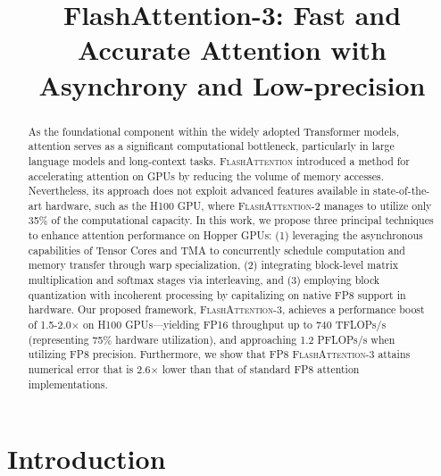 \title{FlashAttention-3: Fast and Accurate Attention with Asynchrony and Low-precision}

\begin{abstract}
As the foundational component within the widely adopted Transformer models, attention serves as a significant computational bottleneck, particularly in large language models and long-context tasks. \textsc{FlashAttention} introduced a method for accelerating attention on GPUs by reducing the volume of memory accesses. Nevertheless, its approach does not exploit advanced features available in state-of-the-art hardware, such as the H100 GPU, where \textsc{FlashAttention-2} manages to utilize only 35\% of the computational capacity. In this work, we propose three principal techniques to enhance attention performance on Hopper GPUs: (1) leveraging the asynchronous capabilities of Tensor Cores and TMA to concurrently schedule computation and memory transfer through warp specialization, (2) integrating block-level matrix multiplication and softmax stages via interleaving, and (3) employing block quantization with incoherent processing by capitalizing on native FP8 support in hardware. Our proposed framework, \textsc{FlashAttention-3}, achieves a performance boost of 1.5-2.0$\times$ on H100 GPUs—yielding FP16 throughput up to 740 TFLOPs/s (representing 75\% hardware utilization), and approaching 1.2 PFLOPs/s when utilizing FP8 precision. Furthermore, we show that FP8 \textsc{FlashAttention-3} attains numerical error that is 2.6$\times$ lower than that of standard FP8 attention implementations.
\end{abstract}

\section{Introduction}
\label{sec:intro}

